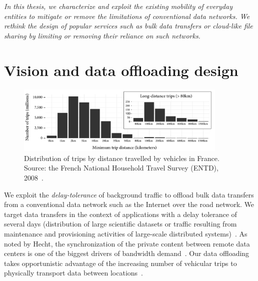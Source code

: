 \begin{displayquote}
\textit{In this thesis, we characterize and exploit the existing mobility of everyday entities to mitigate or remove the limitations of conventional data networks. We rethink the design of popular services such as bulk data transfers or cloud-like file sharing by limiting or removing their reliance on such networks.
}\end{displayquote}


\section{Vision and data offloading design}

\begin{figure}[t]
   \centering
   \includegraphics[width=0.9\textwidth]{figures/entd.pdf}
   \caption{Distribution of trips by distance travelled by vehicles in France. Source: the French National Household Travel Survey (ENTD), 2008~\cite{ENTD}.}
   \label{fig:entd}
\end{figure}

We exploit the \textit{delay-tolerance} of background traffic to offload bulk data transfers from a conventional data network such as the Internet over the road network. We target data transfers in the context of applications with a delay tolerance of several days (\eg distribution of large scientific datasets or traffic resulting from maintenance and provisioning activities of large-scale distributed systems)~\cite{laoutaris2009delay}. As noted by Hecht, the synchronization of the private content between remote data centers is one of the biggest drivers of bandwidth demand~\cite{hecht2016bandwidth}. Our data offloading takes opportunistic advantage of the increasing number of vehicular trips to physically transport data between locations~\cite{le2010mobilite}. 

